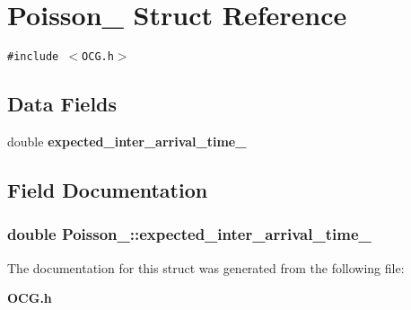 \section{Poisson\_\- Struct Reference}
\label{structPoisson__}
{\tt \#include $<$OCG.h$>$}

\subsection*{Data Fields}
\begin{CompactItemize}
\item 
double {\bf expected\_\-inter\_\-arrival\_\-time\_\-}
\end{CompactItemize}


\subsection{Field Documentation}
\subsubsection[{expected\_\-inter\_\-arrival\_\-time\_\-}]{\setlength{\rightskip}{0pt plus 5cm}double {\bf Poisson\_\-::expected\_\-inter\_\-arrival\_\-time\_\-}}\label{structPoisson___8cfb0c20f75b1ab0033d85e3a6cecab6}




The documentation for this struct was generated from the following file:\begin{CompactItemize}
\item 
{\bf OCG.h}\end{CompactItemize}
